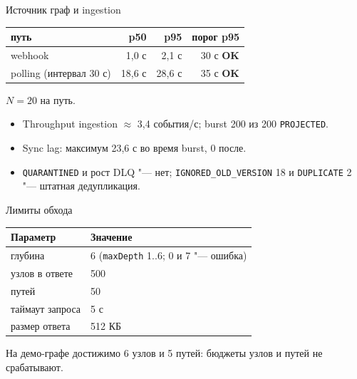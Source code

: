 \begin{frame}{Источник \ar{} граф и ingestion}
  \small
  \begin{tabular}{@{}lrrr@{}}
    \toprule
    путь & p50 & p95 & порог p95 \\
    \midrule
    webhook & 1,0 с & 2,1 с & 30 с \textbf{OK} \\
    polling (интервал 30 с) & 18,6 с & 28,6 с & 35 с \textbf{OK} \\
    \bottomrule
  \end{tabular}

  \vspace{2mm}
  $N=20$ на путь.
  \begin{itemize}\small
    \item Throughput ingestion $\approx$ 3,4 события/с; burst 200 из 200 \texttt{PROJECTED}.
    \item Sync lag: максимум 23,6 с во время burst, 0 после.
    \item \texttt{QUARANTINED} и рост DLQ "--- нет; \texttt{IGNORED\_OLD\_VERSION} 18 и \texttt{DUPLICATE} 2 "--- штатная дедупликация.
  \end{itemize}
\end{frame}

\begin{frame}{Лимиты обхода}
  \small
  \begin{tabular}{@{}ll@{}}
    \toprule
    Параметр & Значение \\
    \midrule
    глубина & 6 (\texttt{maxDepth} 1..6; 0 и 7 "--- ошибка) \\
    узлов в ответе & 500 \\
    путей & 50 \\
    таймаут запроса & 5 с \\
    размер ответа & 512 КБ \\
    \bottomrule
  \end{tabular}

  \vspace{2mm}
  На демо-графе достижимо 6 узлов и 5 путей: бюджеты узлов и путей не срабатывают.
\end{frame}
